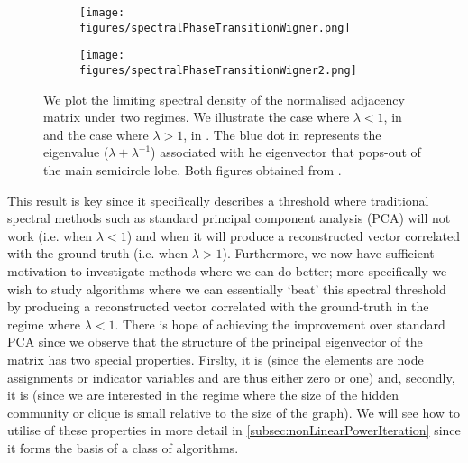 \begin{figure}
	\centering
	\begin{subfigure}{.5\textwidth}
		\centering
		\texttt{[image: figures/spectralPhaseTransitionWigner.png]}
		\caption{}
		\label{fig:spectralPhaseTransitionWigner}
	\end{subfigure}%
	\begin{subfigure}{.5\textwidth}
		\centering
		\texttt{[image: figures/spectralPhaseTransitionWigner2.png]}
		\caption{}
		\label{fig:spectralPhaseTransitionWigner2}
	\end{subfigure}
	\caption[Plots illustrating spectral phase transition of Wigner Matrices.]{\label{fig:spectralPhaseTransitionWignerPlots} We plot the limiting spectral density of the normalised adjacency matrix under two regimes. We illustrate the case where $\lambda < 1$, in  and the case where $\lambda > 1$, in . The blue dot in  represents the eigenvalue ($\lambda + \lambda^{-1}$) associated with he eigenvector that pops-out of the main semicircle lobe. Both figures obtained from \cite{Mon13}.}
\end{figure}

This result is key since it specifically describes a threshold where traditional spectral methods such as standard principal component analysis (PCA) will not work (i.e. when $\lambda < 1$) and when it will produce a reconstructed vector correlated with the ground-truth (i.e. when $\lambda > 1$).
Furthermore, we now have sufficient motivation to investigate methods where we can do better; more specifically we wish to study algorithms where we can essentially `beat' this spectral threshold by producing a reconstructed vector correlated with the ground-truth in the regime where $\lambda < 1$.
There is hope of achieving the improvement over standard PCA since we observe that the structure of the principal eigenvector of the matrix has two special properties.
Firslty, it is  (since the elements are node assignments or indicator variables and are thus either zero or one) and, secondly, it is  (since we are interested in the regime where the size of the hidden community or clique is small relative to the size of the graph).
We will see how to utilise of these properties in more detail in \cref{subsec:nonLinearPowerIteration} since it forms the basis of a class of algorithms.

